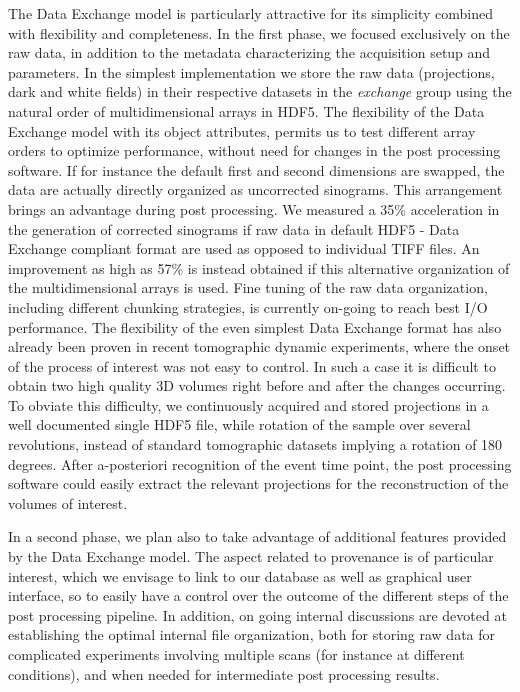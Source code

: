 \documentclass[pdf]{iucr}              %
\begin{document}
The Data Exchange model is particularly attractive for its simplicity combined with flexibility and completeness. In the first phase, we focused exclusively on the raw data, in addition to the metadata characterizing the acquisition setup and parameters. In the simplest implementation we store the raw data (projections, dark and white fields) in their respective datasets in the \emph{exchange} group using the natural order of multidimensional arrays in HDF5. The flexibility of the Data Exchange model with its object attributes, permits us to test different array orders to optimize performance, without need for changes in the post processing software. If for instance the default first and second dimensions are swapped, the data are actually directly organized as uncorrected sinograms. This arrangement brings an advantage during post processing. We measured a 35\% acceleration in the generation of corrected sinograms if raw data in default HDF5 - Data Exchange compliant format are used as opposed to individual TIFF files. An improvement as high as 57\% is instead obtained if this alternative organization of the multidimensional arrays is used. Fine tuning of the raw data organization, including different chunking strategies, is currently on-going to reach best I/O performance. The flexibility of the even simplest Data Exchange format has also already been proven in recent tomographic dynamic experiments, where the onset of the process of interest was not easy to control. In such a case it is difficult to obtain two high quality 3D volumes right before and after the changes occurring. To obviate this difficulty, we continuously acquired and stored projections in a well documented single HDF5 file, while rotation of the sample over several revolutions, instead of standard tomographic datasets implying a rotation of 180 degrees. After a-posteriori recognition of the event time point, the post processing software could easily extract the relevant projections for the reconstruction of the volumes of interest. 

In a second phase, we plan also to take advantage of additional features provided by the Data Exchange model. The aspect related to provenance is of particular interest, which we envisage to link to our database as well as graphical user interface, so to easily have a control over the outcome of the different steps of the post processing pipeline. In addition, on going internal discussions are devoted at establishing the optimal internal file organization, both for storing raw data for complicated experiments involving multiple scans (for instance at different conditions), and when needed for intermediate post processing results.
\end{document}
